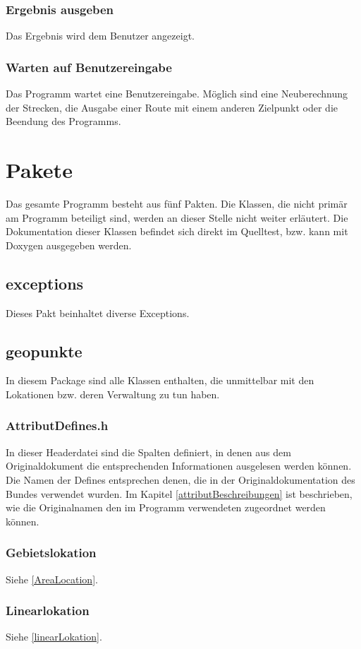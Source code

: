 \documentclass[12pt, a4paper, ngerman]{article}
\begin{document}
\subsubsection{Ergebnis ausgeben}
Das Ergebnis wird dem Benutzer angezeigt.

\subsubsection{Warten auf Benutzereingabe}
Das Programm wartet eine Benutzereingabe. Möglich sind eine Neuberechnung der Strecken, die Ausgabe einer Route mit einem anderen Zielpunkt oder die Beendung des Programms.

\section{Pakete}
Das gesamte Programm besteht aus fünf Pakten. Die Klassen, die nicht primär am Programm beteiligt sind, werden an dieser Stelle nicht weiter erläutert. Die Dokumentation dieser Klassen befindet sich direkt im Quelltest, bzw. kann mit Doxygen ausgegeben werden.
\subsection{exceptions}
Dieses Pakt beinhaltet diverse Exceptions. 

\subsection{geopunkte}
In diesem Package sind alle Klassen enthalten, die unmittelbar mit den Lokationen bzw. deren Verwaltung zu tun haben.
\subsubsection{AttributDefines.h}
In dieser Headerdatei sind die Spalten definiert, in denen aus dem Originaldokument die entsprechenden Informationen ausgelesen werden können. Die Namen der Defines entsprechen denen, die in der Originaldokumentation des Bundes verwendet wurden. Im Kapitel \ref{attributBeschreibungen} ist beschrieben, wie die Originalnamen den im Programm verwendeten zugeordnet werden können. 

\subsubsection{Gebietslokation}
Siehe \ref{AreaLocation}.

\subsubsection{Linearlokation}
Siehe \ref{linearLokation}.
\end{document}
